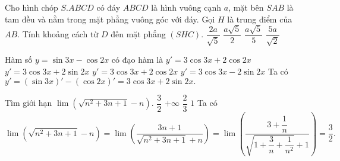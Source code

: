 \begin{ex}%
	Cho hình chóp $S.ABCD$ có đáy $ABCD$ là hình vuông cạnh $a$, mặt bên $SAB$ là tam đều và nằm trong mặt phẳng vuông góc với đáy. Gọi $H$ là trung điểm của $AB$. Tính khoảng cách từ $D$ đến mặt phẳng $(SHC).$
	\choice
	{\True $\dfrac{2a}{\sqrt{5}}$}
	{ $\dfrac{a\sqrt{5}}{2}$}
	{$\dfrac{a\sqrt{5}}{5}$}
	{$\dfrac{5a}{\sqrt{2}}$}
	\loigiai
	{ 
	}
\end{ex}

\begin{ex}%
	Hàm số $y=\sin {3x}-\cos {2x}$ có đạo hàm là
	\choice
	{$y'=3 \cos {3x}+2 \cos {2x}$}
	{\True $y'=3 \cos {3x}+2 \sin {2x}$}
	{$y'=3 \cos {3x}+2 \cos {2x}$}
	{ $y'=3 \cos {3x}-2\sin {2x}$}
	\loigiai
	{ Ta có $y'=\left(\sin {3x}\right)'-\left(\cos {2x}\right)' =3 \cos {3x}+2 \sin {2x}.$ 
	}
\end{ex}

\begin{ex}%
	Tìm giới hạn $ \lim\limits \left( \sqrt{n^2+3n+1}-n\right).$
	\choice
	{\True $\dfrac{3}{2}$}
	{$+ \infty $}
	{$\dfrac{2}{3}$}
	{$1$}
	\loigiai
	{ Ta có 
		$$\lim\limits \left( \sqrt{n^2+3n+1}-n\right)= \lim\limits \left( \dfrac{3n+1}{\sqrt{n^2+3n+1}+n}\right)= \lim\limits \left( \dfrac{3+\dfrac{1}{n}}{\sqrt{1+\dfrac{3}{n}+\dfrac{1}{n^2}}+1}\right) = \dfrac{3}{2}.$$
	}
\end{ex}

